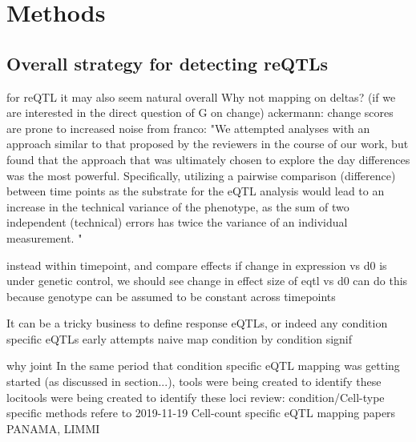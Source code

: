 \section{Methods}

\subsection{Overall strategy for detecting reQTLs}


for reQTL
it may also seem natural
overall Why not mapping on deltas? (if we are interested in the direct question of G on change)
    ackermann: change scores are prone to increased noise
    from franco: "We attempted analyses with an approach similar to that proposed by the reviewers in the course of our work, but found that the approach that was ultimately chosen to explore the day differences was the most powerful. Specifically, utilizing a pairwise comparison (difference) between time points as the substrate for the eQTL analysis would lead to an increase in the technical variance of the phenotype, as the sum of two independent (technical) errors has twice the variance of an individual measurement. "

instead within timepoint, and compare effects
if change in expression vs d0 is under genetic control, we should see change in effect size of eqtl vs d0
can do this because genotype can be assumed to be constant across timepoints

It can be a tricky business to define response eQTLs, or indeed any condition specific eQTLs
    early attempts
    naive
    map condition by condition
    signif

why joint
In the same period that condition specific eQTL mapping was getting started (as discussed in section...), tools were being created to identify these locitools were being created to identify these loci
review: condition/Cell-type specific methods
refere to 2019-11-19 Cell-count specific eQTL mapping papers
PANAMA, LIMMI

